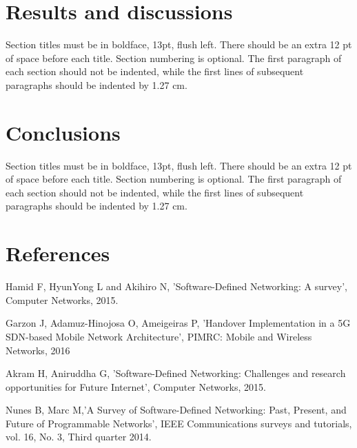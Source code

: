 \documentclass[12pt]{article}
\begin{document}
\section{Results and discussions}

Section titles must be in boldface, 13pt, flush left. There should be an extra
12 pt of space before each title. Section numbering is optional. The first
paragraph of each section should not be indented, while the first lines of
subsequent paragraphs should be indented by 1.27 cm.

\section{Conclusions}

Section titles must be in boldface, 13pt, flush left. There should be an extra
12 pt of space before each title. Section numbering is optional. The first
paragraph of each section should not be indented, while the first lines of
subsequent paragraphs should be indented by 1.27 cm.


\section{References}
      Hamid F, HyunYong L and Akihiro N, ’Software-Defined Networking: A survey’, Computer Networks, 2015.

      Garzon J, Adamuz-Hinojosa O, Ameigeiras P, ’Handover Implementation in a 5G SDN-based Mobile Network Architecture’, PIMRC: Mobile and Wireless Networks, 2016

      Akram H, Aniruddha G, ’Software-Defined Networking: Challenges and research opportunities for Future Internet’, Computer Networks, 2015.

      Nunes B, Marc M,’A Survey of Software-Defined Networking: Past, Present, and Future of Programmable Networks’, IEEE Communications surveys and tutorials, vol. 16, No. 3, Third quarter 2014.



\end{document}
